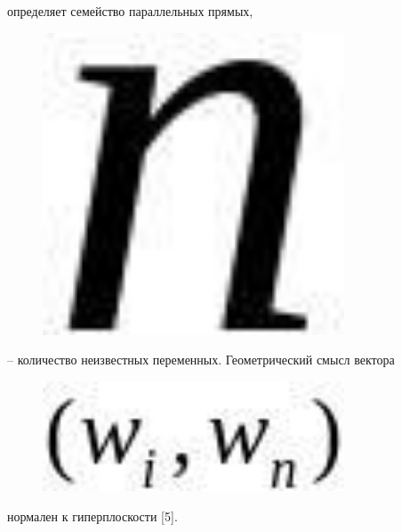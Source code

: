 определяет семейство параллельных прямых,
\begin{figure}[H]
	\centering
	\includegraphics[width=0.8\textwidth]{assets/82}
	\caption*{}
\end{figure} -- количество неизвестных переменных.
Геометрический смысл вектора \begin{figure}[H]
	\centering
	\includegraphics[width=0.8\textwidth]{assets/91}
	\caption*{}
\end{figure}
нормален к гиперплоскости {[}5{]}.

